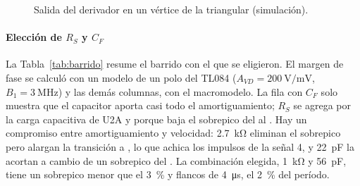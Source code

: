 \begin{figure}[!htb]
\centering
{}
\caption{Salida del derivador en un vértice de la triangular (simulación).}
\label{fig:dertr}
\end{figure}

\paragraph*{Elección de $R_S$ y $C_F$} La Tabla~\ref{tab:barrido} resume el barrido con el que se eligieron. El margen de fase se calculó con un modelo de un polo del TL084 ($A_{VD} = \SI{200}{\volt\per\milli\volt}$, $B_1 = \SI{3}{\mega\hertz}$) y las demás columnas, con el macromodelo. La fila con $C_F$ solo muestra que el capacitor aporta casi todo el amortiguamiento; $R_S$ se agrega por la carga capacitiva de U2A y porque baja el sobrepico del  al . Hay un compromiso entre amortiguamiento y velocidad: \SI{2,7}{\kilo\ohm} eliminan el sobrepico pero alargan la transición a , lo que achica los impulsos de la señal 4, y \SI{22}{\pico\farad} la acortan a cambio de un sobrepico del . La combinación elegida, \SI{1}{\kilo\ohm} y \SI{56}{\pico\farad}, tiene un sobrepico menor que el \SI{3}{\percent} y flancos de \SI{4}{\micro\second}, el \SI{2}{\percent} del período.

